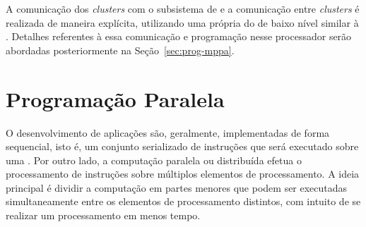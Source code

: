 A comunicação dos \textit{clusters} com o subsistema de \es e a comunicação
entre \textit{clusters} é realizada de maneira explícita, utilizando uma \api
própria do \mppa de baixo nível similar à \posix \ipc. Detalhes referentes à
essa comunicação e programação nesse processador serão abordadas posteriormente
na Seção~\ref{sec:prog-mppa}.




\section{Programação Paralela}
\label{sec:prog-paralela}

O desenvolvimento de aplicações são, geralmente, implementadas de forma
sequencial, isto é, um conjunto serializado de instruções que será executado
sobre uma \cpu. Por outro lado, a computação paralela ou distribuída efetua o
processamento de instruções sobre múltiplos elementos de processamento. A ideia
principal é dividir a computação em partes menores que podem ser executadas
simultaneamente entre os elementos de processamento distintos, com intuito de se
realizar um processamento em menos tempo.

